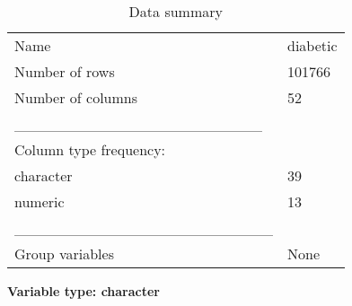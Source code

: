 \documentclass[
]{article}
\begin{document}
\begin{longtable}[]{@{}ll@{}}
\caption{Data summary}\tabularnewline
\toprule\noalign{}
\endfirsthead
\endhead
\bottomrule\noalign{}
\endlastfoot
Name & diabetic \\
Number of rows & 101766 \\
Number of columns & 52 \\
\_\_\_\_\_\_\_\_\_\_\_\_\_\_\_\_\_\_\_\_\_\_\_ & \\
Column type frequency: & \\
character & 39 \\
numeric & 13 \\
\_\_\_\_\_\_\_\_\_\_\_\_\_\_\_\_\_\_\_\_\_\_\_\_ & \\
Group variables & None \\
\end{longtable}

\textbf{Variable type: character}
\end{document}
